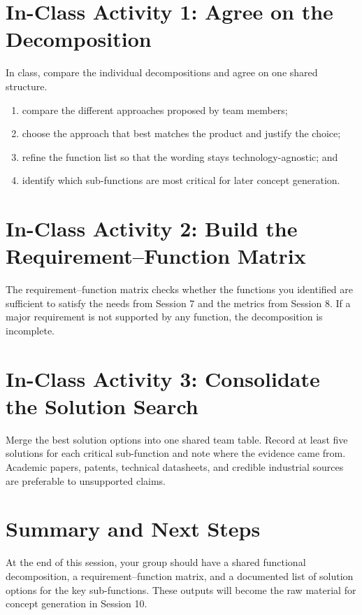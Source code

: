 \section{In-Class Activity 1: Agree on the Decomposition}

In class, compare the individual decompositions and agree on one shared structure.

\begin{enumerate}
    \item compare the different approaches proposed by team members;
    \item choose the approach that best matches the product and justify the choice;
    \item refine the function list so that the wording stays technology-agnostic; and
    \item identify which sub-functions are most critical for later concept generation.
\end{enumerate}

\section{In-Class Activity 2: Build the Requirement--Function Matrix}

The requirement--function matrix checks whether the functions you identified are sufficient to satisfy the needs from Session 7 and the metrics from Session 8. If a major requirement is not supported by any function, the decomposition is incomplete.



\section{In-Class Activity 3: Consolidate the Solution Search}

Merge the best solution options into one shared team table. Record at least five solutions for each critical sub-function and note where the evidence came from. Academic papers, patents, technical datasheets, and credible industrial sources are preferable to unsupported claims.

\section{Summary and Next Steps}

At the end of this session, your group should have a shared functional decomposition, a requirement--function matrix, and a documented list of solution options for the key sub-functions. These outputs will become the raw material for concept generation in Session 10.
